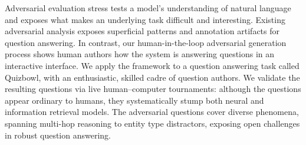 Adversarial evaluation stress tests a model's understanding of natural
language and exposes what makes an underlying task difficult and
interesting.
Existing adversarial analysis exposes superficial patterns and
annotation artifacts for question answering.
In contrast, our human-in-the-loop adversarial generation process
shows human authors how the system is answering questions in an
interactive interface.
We apply the framework to a question answering task called Quizbowl,
with an enthusiastic, skilled cadre of question authors.
We validate the resulting questions via live human--computer
tournaments: although the questions appear ordinary to humans, they
systematically stump both neural and information retrieval models.
The adversarial questions cover diverse phenomena, spanning multi-hop
reasoning to entity type distractors, exposing open challenges in
robust question answering.
